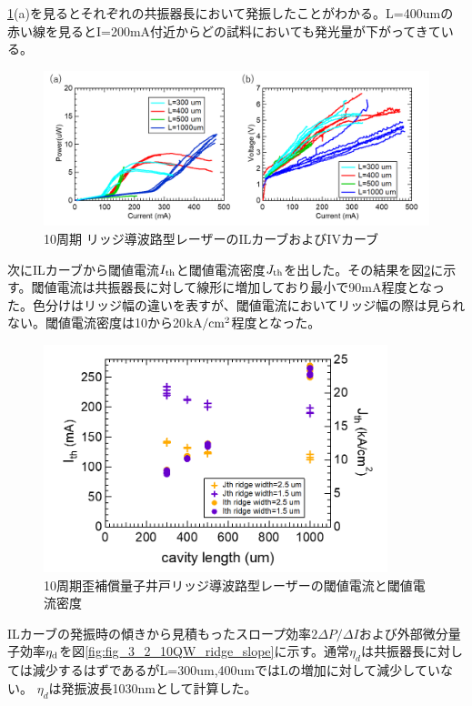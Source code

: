 {\ref{fig:fig_3_2_10QW_ridge_IL}(a)を見るとそれぞれの共振器長において発振したことがわかる。L=400umの赤い線を見るとI=200mA付近からどの試料においても発光量が下がってきている。
\begin{figure}[h]
	\centering
	\includegraphics[width=15cm]{figure/fig_3_2_10QW_ridge_IL.png}
		\caption{10周期 リッジ導波路型レーザーのILカーブおよびIVカーブ}
		\label{fig:fig_3_2_10QW_ridge_IL}
\end{figure}
次にILカーブから閾値電流$I_{\rm{th}}$と閾値電流密度$J_{\rm{th}}$を出した。その結果を図\ref{fig:fig_3_2_10QW_ridge_Ith}に示す。閾値電流は共振器長に対して線形に増加しており最小で90mA程度となった。色分けはリッジ幅の違いを表すが、閾値電流においてリッジ幅の際は見られない。閾値電流密度は10から20$\rm{kA/cm^{2}}$程度となった。
\begin{figure}[h]
	\centering
	\includegraphics[width=10cm]{figure/fig_3_2_10QW_ridge_Ith.png}
		\caption{10周期歪補償量子井戸リッジ導波路型レーザーの閾値電流と閾値電流密度}
		\label{fig:fig_3_2_10QW_ridge_Ith}
\end{figure}
ILカーブの発振時の傾きから見積もったスロープ効率$2\Delta P/\Delta I$および外部微分量子効率$\eta_{\rm{d}}$を図\ref{fig:fig_3_2_10QW_ridge_slope}に示す。通常$\eta_{d}$は共振器長に対しては減少するはずであるがL=300um,400umではLの増加に対して減少していない。
$\eta_{d}$は発振波長1030nmとして計算した。
\begin{figure}[h]

\end{figure}}
